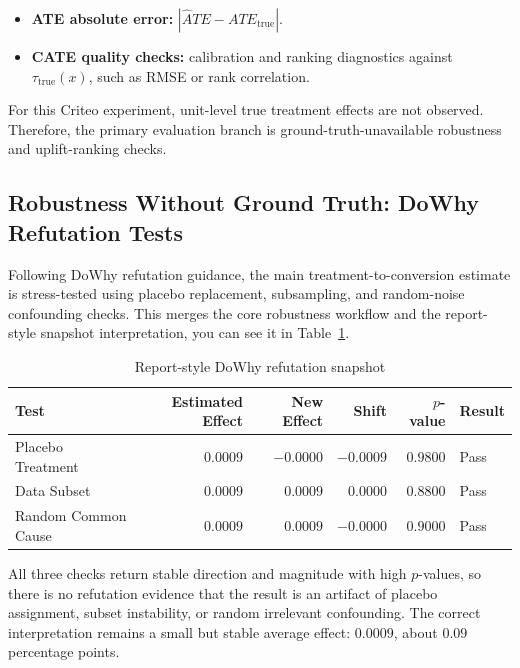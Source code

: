 \documentclass[journal,11pt,onecolumn]{IEEEtran}
\begin{document}
\begin{itemize}
    \item \textbf{ATE absolute error:} \(|\hat{A}\mathit{TE} - \mathit{ATE}_{\mathrm{true}}|\).
    \item \textbf{CATE quality checks:} calibration and ranking diagnostics against \(\tau_{\mathrm{true}}(x)\), such as RMSE or rank correlation.
\end{itemize}

For this Criteo experiment, unit-level true treatment effects are not observed. Therefore, the primary evaluation branch is ground-truth-unavailable robustness and uplift-ranking checks.

\subsection{Robustness Without Ground Truth: DoWhy Refutation Tests}

Following DoWhy refutation guidance, the main treatment-to-conversion estimate is stress-tested using placebo replacement, subsampling, and random-noise confounding checks. This merges the core robustness workflow and the report-style snapshot interpretation, you can see it in Table~\ref{tab:refutation_snapshot}.

\begin{table}[!htbp]
    \centering
    \caption{Report-style DoWhy refutation snapshot}
    \label{tab:refutation_snapshot}
    \small
    \begin{tabular}{lrrrrl}
        \toprule
        Test                & Estimated Effect & New Effect  & Shift       & \(p\)-value & Result \\
        \midrule
        Placebo Treatment   & \(0.0009\)       & \(-0.0000\) & \(-0.0009\) & \(0.9800\)  & Pass   \\
        Data Subset         & \(0.0009\)       & \(0.0009\)  & \(0.0000\)  & \(0.8800\)  & Pass   \\
        Random Common Cause & \(0.0009\)       & \(0.0009\)  & \(-0.0000\) & \(0.9000\)  & Pass   \\
        \bottomrule
    \end{tabular}
\end{table}


All three checks return stable direction and magnitude with high \(p\)-values, so there is no refutation evidence that the result is an artifact of placebo assignment, subset instability, or random irrelevant confounding. The correct interpretation remains a small but stable average effect: \(0.0009\), about \(0.09\) percentage points.
\end{document}
